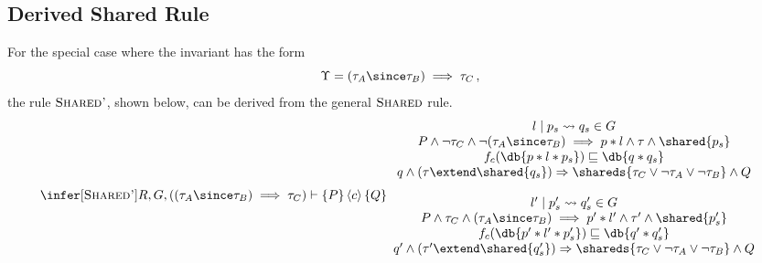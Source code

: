 \subsection{Derived Shared Rule}
For the special case where the invariant has the form 
\[
\Upsilon = (\tau_A \since \tau_B) \implies \tau_C\,,
\]
the rule $\textsc{Shared'}$, shown below, can be  
derived from the general $\textsc{Shared}$ rule.
\[
\begin{array}{c}
%
\infer[\textsc{Shared'}]{
R, G, ((\tau_A \since \tau_B) \implies \tau_C) \vdash 
\{P \}
\, \langle c \rangle\, 
\{ Q \} %
}{
\begin{array}{c}  
l \mid p_s \leadsto q_s \in G
\\
P \wedge \neg \tau_C \wedge \neg (\tau_A \since \tau_B) \implies  p * l \wedge \tau \wedge \shared{p_s}
\\
f_c(\db{p * l * p_s}) \sqsubseteq \db{q * q_s}
\\
q \wedge (\tau \extend \shared{q_s})
\Rightarrow  
\shareds{\tau_C \lor \neg \tau_A \lor \neg \tau_B} \land Q
\\
\\
l' \mid p'_s \leadsto q'_s \in G
\\
P \wedge \tau_C \wedge (\tau_A \since \tau_B) \implies  p' * l' \wedge \tau' \wedge \shared{p'_s}
\\
f_c(\db{p' * l' * p'_s}) \sqsubseteq \db{q' * q'_s}
\\
q' \wedge (\tau' \extend \shared{q'_s})
\Rightarrow  
\shareds{\tau_C \lor \neg \tau_A \lor \neg \tau_B} \land Q
\\
\\

\end{array}}
\end{array}\]
